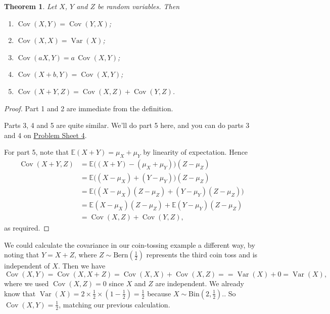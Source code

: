 \documentclass[
  a4paper,
]{book}
\providecommand{\tightlist}{%
  \setlength{\itemsep}{0pt}\setlength{\parskip}{0pt}}
\newtheorem{theorem}{Theorem}[chapter]
\theoremstyle{definition}
\theoremstyle{definition}
\theoremstyle{definition}
\theoremstyle{definition}
\theoremstyle{remark}
\begin{document}
\begin{theorem}

Let \(X\), \(Y\) and \(Z\) be random variables. Then

\begin{enumerate}
\def\labelenumi{\arabic{enumi}.}
\tightlist
\item
  \(\operatorname{Cov}(X,Y) = \operatorname{Cov}(Y,X)\);
\item
  \(\operatorname{Cov}(X,X) = \operatorname{Var}(X)\);
\item
  \(\operatorname{Cov}(aX, Y) = a\,\operatorname{Cov}(X,Y)\);
\item
  \(\operatorname{Cov}(X + b, Y) = \operatorname{Cov}(X,Y)\);
\item
  \(\operatorname{Cov}(X + Y, Z) = \operatorname{Cov}(X, Z) + \operatorname{Cov}(Y,Z)\).
\end{enumerate}

\end{theorem}

\begin{proof}
Part 1 and 2 are immediate from the definition.

Parts 3, 4 and 5 are quite similar. We'll do part 5 here, and you can do parts 3 and 4 on \protect\hyperlink{P4}{Problem Sheet 4}.

For part 5, note that \(\mathbb E(X + Y) = \mu_X + \mu_Y\) by linearity of expectation. Hence
\begin{align*}
\operatorname{Cov}(X + Y, Z)
  &= \mathbb E \big((X + Y) - (\mu_X + \mu_Y)\big)(Z - \mu_Z) \\
  &= \mathbb E \big((X - \mu_X) + (Y - \mu_Y)\big)(Z - \mu_Z) \\
  &= \mathbb E \big((X - \mu_X)(Z - \mu_Z) + (Y - \mu_Y) (Z - \mu_Z) \big) \\
  &= \mathbb E (X - \mu_X)(Z - \mu_Z) + \mathbb E  (Y - \mu_Y) (Z - \mu_Z) \\
  &= \operatorname{Cov}(X,Z) + \operatorname{Cov}(Y,Z) ,
\end{align*}
as required.
\end{proof}

We could calculate the covariance in our coin-tossing example a different way, by noting that \(Y = X + Z\), where \(Z \sim \text{Bern}(\frac12)\) represents the third coin toss and is independent of \(X\). Then we have
\[
\operatorname{Cov}(X,Y) = \operatorname{Cov}(X, X + Z) = \operatorname{Cov}(X, X) + \operatorname{Cov}(X, Z) =
= \operatorname{Var}(X) + 0 = \operatorname{Var}(X) ,\]
where we used \(\operatorname{Cov}(X, Z) = 0\) since \(X\) and \(Z\) are independent.
We already know that \(\operatorname{Var}(X) = 2 \times \tfrac12 \times (1 - \tfrac12) = \tfrac12\) because \(X \sim \text{Bin}(2, \frac12)\).. So \(\operatorname{Cov}(X,Y) = \frac12\),
matching our previous calculation.
\end{document}
